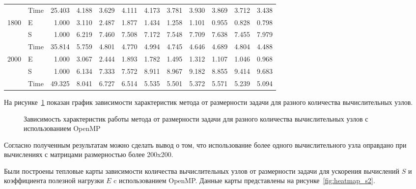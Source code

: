 \begin{table}[H]
\begin{tabular}{|l|l|rrrrrrrrrr|}
        & Time & 25.403 & 4.188 & 3.629 & 4.111 & 4.173 & 3.781 & 3.930 & 3.869 & 3.712 & 3.438 \\
        \cline{1-12}
        \multirow[t]{3}{*}{1800} & E    & 1.000  & 3.110 & 2.487 & 1.877 & 1.434 & 1.258 & 1.101 & 0.955 & 0.828 & 0.798 \\
        & S    & 1.000  & 6.219 & 7.460 & 7.508 & 7.172 & 7.548 & 7.709 & 7.638 & 7.455 & 7.979 \\
        & Time & 35.814 & 5.759 & 4.801 & 4.770 & 4.994 & 4.745 & 4.646 & 4.689 & 4.804 & 4.488 \\
        \cline{1-12}
        \multirow[t]{3}{*}{2000} & E    & 1.000  & 3.067 & 2.444 & 1.893 & 1.782 & 1.495 & 1.312 & 1.107 & 1.046 & 0.968 \\
        & S    & 1.000  & 6.134 & 7.333 & 7.572 & 8.911 & 8.967 & 9.182 & 8.855 & 9.414 & 9.683 \\
        & Time & 49.325 & 8.041 & 6.727 & 6.514 & 5.535 & 5.501 & 5.372 & 5.571 & 5.239 & 5.094 \\
        \cline{1-12}
        \bottomrule
    \end{tabular}
\end{table}



На рисунке~\ref{fig:graph_2} показан график зависимости характеристик метода от размерности задачи для разного количества вычислительных узлов.

\begin{figure}[H]
    \centering
    
    
    \caption{Зависимость характеристик работы метода от размерности задачи для разного количества вычислительных узлов с использованием OpenMP}
    \label{fig:graph_2}
\end{figure}

Согласно полученным результатам можно сделать вывод о том, что использование более одного вычислительного узла оправдано при вычислениях с матрицами размерностью более 200x200.


Были построены тепловые карты зависимости количества вычислительных узлов от размерности задачи для ускорения вычислений $S$ и коэффициента полезной нагрузки $E$  c использованием OpenMP.
Данные карты представлены на рисунке~\ref{fig:heatmap_s2}.

